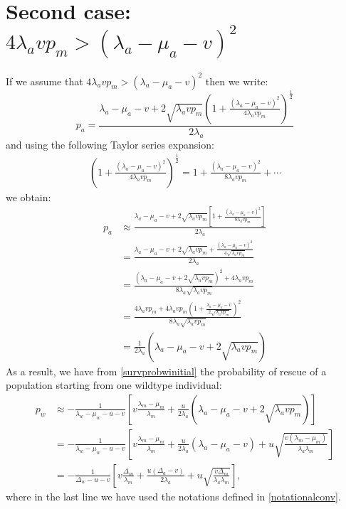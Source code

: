 \documentclass[11pt,a4paper]{article}
\begin{document}
\section{Second case: $4\lambda_avp_m>\left(\lambda_a-\mu_a-v\right)^2$}
If we assume that  $4\lambda_avp_m>\left(\lambda_a-\mu_a-v\right)^2$ then we write:
\begin{equation}
p_a=\frac{\lambda_a-\mu_a-v+2\sqrt{\lambda_a vp_m}\left(1+\frac{\left(\lambda_a-\mu_a-v\right)^2}{4\lambda_avp_m}\right)^{\frac12}}{2\lambda_a}
\end{equation}
and using the following Taylor series expansion:
\begin{align*}
\left(1+\frac{\left(\lambda_a-\mu_a-v\right)^2}{4\lambda_avp_m}\right)^{\frac{1}{2}}=1+\frac{\left(\lambda_a-\mu_a-v\right)^2}{8\lambda_avp_m}+\cdots
\end{align*}
we obtain:
\begin{align*}
p_a&\approx\frac{\lambda_a-\mu_a-v+2\sqrt{\lambda_a vp_m}\left[1+\frac{\left(\lambda_a-\mu_a-v\right)^2}{8\lambda_avp_m}\right]}{2\lambda_a}\\
&=\frac{\lambda_a-\mu_a-v+2\sqrt{\lambda_a vp_m}+\frac{\left(\lambda_a-\mu_a-v\right)^2}{4\sqrt{\lambda_avp_m}}}{2\lambda_a}\\
&=\frac{\left(\lambda_a-\mu_a-v+2\sqrt{\lambda_avp_m}\right)^2+4\lambda_avp_m}{8\lambda_a\sqrt{\lambda_avp_m}}\\
&=\frac{4\lambda_avp_m+4\lambda_avp_m\left(1+\frac{\lambda_a-\mu_a-v}{2\sqrt{\lambda_avp_m}}\right)^2}{8\lambda_a\sqrt{\lambda_avp_m}}\\
&=\frac{1}{2\lambda_a}\left(\lambda_a-\mu_a-v+2\sqrt{\lambda_avp_m}\right)
\end{align*}
As a result, we have from \eqref{survprobwinitial} the probability of rescue of a population starting from one wildtype individual:
\begin{align*}
p_w&\approx-\frac{1}{\lambda_w-\mu_w-u-v}\left[v\frac{\lambda_m-\mu_m}{\lambda_m}+\frac{u}{2\lambda_a}\left(\lambda_a-\mu_a-v+2\sqrt{\lambda_avp_m}\right)\right]\\
&=-\frac{1}{\lambda_w-\mu_w-u-v}\left[v\frac{\lambda_m-\mu_m}{\lambda_m}+\frac{u}{2\lambda_a}\left(\lambda_a-\mu_a-v\right)+u\sqrt{\frac{v\left(\lambda_m-\mu_m\right)}{\lambda_a\lambda_m}}\right]\\
&=-\frac{1}{\Delta_w-u-v}\left[v\frac{\Delta_m}{\lambda_m}+\frac{u\left(\Delta_a-v\right)}{2\lambda_a}+u\sqrt{\frac{v\Delta_m}{\lambda_a\lambda_m}}\right],
\end{align*}
where in the last line we have used the notations defined in \eqref{notationalconv}.
\end{document}
